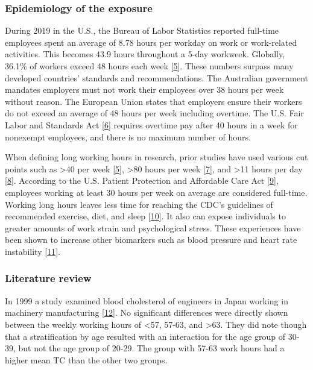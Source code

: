 \documentclass[]{elsarticle} %
\begin{document}
\hypertarget{epidemiology-of-the-exposure}{%
\subsubsection{Epidemiology of the
exposure}\label{epidemiology-of-the-exposure}}

During 2019 in the U.S., the Bureau of Labor Statistics reported
full-time employees spent an average of 8.78 hours per workday on work
or work-related activities. This becomes 43.9 hours throughout a 5-day
workweek. Globally, 36.1\% of workers exceed 48 hours each week
{[}\protect\hyperlink{ref-rivera2020}{5}{]}. These numbers surpass many
developed countries' standards and recommendations. The Australian
government mandates employers must not work their employees over 38
hours per week without reason. The European Union states that employers
ensure their workers do not exceed an average of 48 hours per week
including overtime. The U.S. Fair Labor and Standards Act
{[}\protect\hyperlink{ref-flsa1938}{6}{]} requires overtime pay after 40
hours in a week for nonexempt employees, and there is no maximum number
of hours.

When defining long working hours in research, prior studies have used
various cut points such as \textgreater40 per week
{[}\protect\hyperlink{ref-rivera2020}{5}{]}, \textgreater80 hours per
week {[}\protect\hyperlink{ref-lee2016}{7}{]}, and \textgreater11 hours
per day {[}\protect\hyperlink{ref-lemke2017}{8}{]}. According to the
U.S. Patient Protection and Affordable Care Act
{[}\protect\hyperlink{ref-ppaca2010}{9}{]}, employees working at least
30 hours per week on average are considered full-time. Working long
hours leaves less time for reaching the CDC's guidelines of recommended
exercise, diet, and sleep
{[}\protect\hyperlink{ref-artazcoz2009}{10}{]}. It also can expose
individuals to greater amounts of work strain and psychological stress.
These experiences have been shown to increase other biomarkers such as
blood pressure and heart rate instability
{[}\protect\hyperlink{ref-kivimaki2018}{11}{]}.

\hypertarget{literature-review}{%
\subsubsection{Literature review}\label{literature-review}}

In 1999 a study examined blood cholesterol of engineers in Japan working
in machinery manufacturing {[}\protect\hyperlink{ref-sasaki1999}{12}{]}.
No significant differences were directly shown between the weekly
working hours of \textless57, 57-63, and \textgreater63. They did note
though that a stratification by age resulted with an interaction for the
age group of 30-39, but not the age group of 20-29. The group with 57-63
work hours had a higher mean TC than the other two groups.
\end{document}
